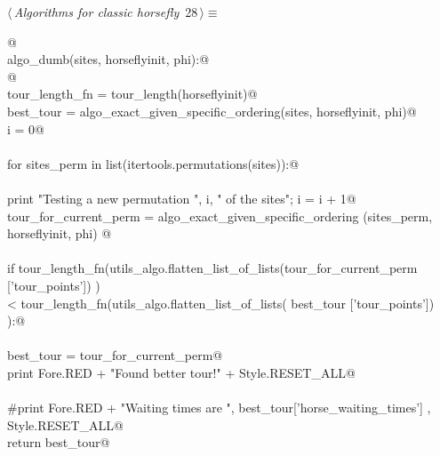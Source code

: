 \documentclass[11.5pt]{report}
\begin{document}
\begin{flushleft} \small
\begin{minipage}{\linewidth}\label{scrap35}\raggedright\small
{} $\langle\,${\itshape Algorithms for classic horsefly}\nobreak\ {\footnotesize {28}}$\,\rangle\equiv$
\vspace{-1ex}
\begin{list}{}{} \item
\mbox{}\verb@   @\\
\mbox{}\verb@def algo_dumb(sites, horseflyinit, phi):@\\
\mbox{}\verb@      @\\
\mbox{}\verb@    tour_length_fn = tour_length(horseflyinit)@\\
\mbox{}\verb@    best_tour      = algo_exact_given_specific_ordering(sites, horseflyinit, phi)@\\
\mbox{}\verb@    i              = 0@\\
\mbox{}\verb@@\\
\mbox{}\verb@    for sites_perm in list(itertools.permutations(sites)):@\\
\mbox{}\verb@@\\
\mbox{}\verb@        print "Testing a new permutation ", i, " of the sites"; i = i + 1@\\
\mbox{}\verb@        tour_for_current_perm = algo_exact_given_specific_ordering (sites_perm, horseflyinit, phi) @\\
\mbox{}\verb@@\\
\mbox{}\verb@        if tour_length_fn(utils_algo.flatten_list_of_lists(tour_for_current_perm ['tour_points']) ) \@\\
\mbox{}\verb@         < tour_length_fn(utils_algo.flatten_list_of_lists(            best_tour ['tour_points']) ):@\\
\mbox{}\verb@@\\
\mbox{}\verb@                best_tour = tour_for_current_perm@\\
\mbox{}\verb@                print Fore.RED + "Found better tour!" + Style.RESET_ALL@\\
\mbox{}\verb@@\\
\mbox{}\verb@    #print Fore.RED + "\nHorse Waiting times are ", best_tour['horse_waiting_times'] , Style.RESET_ALL@\\
\mbox{}\verb@    return best_tour@\\
\mbox{}\verb@@{\NWsep}
\end{list}
\vspace{-1.5ex}

\end{minipage}
\end{flushleft}
\end{document}
